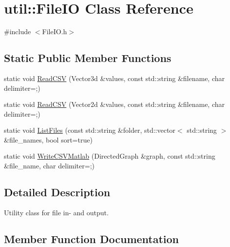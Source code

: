 \hypertarget{classutil_1_1FileIO}{}\section{util\+:\+:File\+IO Class Reference}
\label{classutil_1_1FileIO}


{\ttfamily \#include $<$File\+I\+O.\+h$>$}

\subsection*{Static Public Member Functions}
\begin{DoxyCompactItemize}
\item 
static void \hyperlink{classutil_1_1FileIO_af42c183525923014e142a10a626d3677}{Read\+C\+SV} (Vector3d \&values, const std\+::string \&filename, char delimiter=\textquotesingle{};\textquotesingle{})
\item 
static void \hyperlink{classutil_1_1FileIO_a264c9b694fd7218635c8a783956d2c1e}{Read\+C\+SV} (Vector2d \&values, const std\+::string \&filename, char delimiter=\textquotesingle{};\textquotesingle{})
\item 
static void \hyperlink{classutil_1_1FileIO_a6e290e22083d49619b757bfca96a51fa}{List\+Files} (const std\+::string \&folder, std\+::vector$<$ std\+::string $>$ \&file\+\_\+names, bool sort=true)
\item 
static void \hyperlink{classutil_1_1FileIO_a862586aced240e732ecd35773b57c267}{Write\+C\+S\+V\+Matlab} (Directed\+Graph \&graph, const std\+::string \&file\+\_\+name, char delimiter=\textquotesingle{};\textquotesingle{})
\end{DoxyCompactItemize}


\subsection{Detailed Description}
Utility class for file in-\/ and output. 

\subsection{Member Function Documentation}
